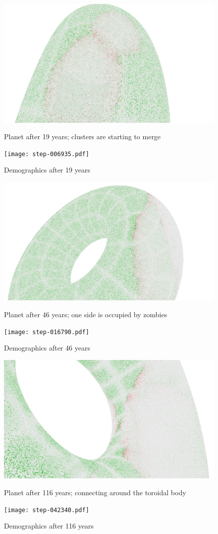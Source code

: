 \documentclass[a4paper]{article}
\begin{document}
\begin{figure}[pht]
    \centering
    \includegraphics[width=\textwidth]{torus/step-006935-torus.png}
    \caption{Planet after 19 years; clusters are starting to merge}
    \texttt{[image: step-006935.pdf]}
    \caption{Demographics after 19 years}
\end{figure}

\begin{figure}[pht]
    \centering
    \includegraphics[width=\textwidth]{torus/step-016790-torus.png}
    \caption{Planet after 46 years; one side is occupied by zombies}
    \texttt{[image: step-016790.pdf]}
    \caption{Demographics after 46 years}
\end{figure}

\begin{figure}[pht]
    \centering
    \includegraphics[width=\textwidth]{torus/step-042340-torus.png}
    \caption{Planet after 116 years; connecting around the toroidal body}
    \texttt{[image: step-042340.pdf]}
    \caption{Demographics after 116 years}
\end{figure}
\end{document}
